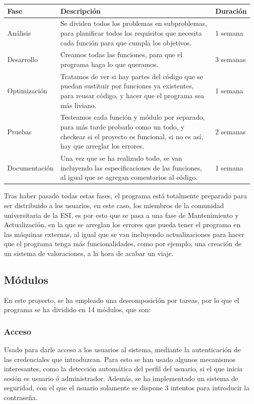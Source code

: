 \begin{tabular}{|p{2.5cm}|p{8cm}|p{2cm}|}
  \hline
  \textbf{Fase} & \textbf{Descripción} & \textbf{Duración} \\
  \hline
  Análisis & Se dividen todos los problemas en subproblemas, para planificar todos los requisitos que necesita cada función para que cumpla los objetivos. & 1 semana \\
  \hline
  Desarrollo & Creamos todas las funciones, para que el programa haga lo que queramos. & 3 semanas \\
  \hline
  Optimización & Tratamos de ver si hay partes del código que se puedan sustituir por funciones ya existentes, para reusar código, y hacer que el programa sea más liviano. & 1 semana \\
  \hline
  Pruebas & Testeamos cada función y módulo por separado, para más tarde probarlo como un todo, y checkear si el proyecto es funcional, si no es así, hay que arreglar los errores. & 2 semanas \\
  \hline
  Documentación & Una vez que se ha realizado todo, se van incluyendo las especificaciones de las funciones, al igual que se agregan comentarios al código. & 1 semana \\
  \hline
\end{tabular}

\bigskip

Tras haber pasado todas estas fases, el programa está totalmente preparado para ser distribuido a los usuarios, en este caso, los miembros de la comunidad universitaria de la ESI,
es por esto que se pasa a una fase de Mantenimiento y Actualización, en la que se arreglan los errores que pueda tener el programa en las máquinas externas,
al igual que se van incluyendo actualizaciones para hacer que el programa tenga más funcionalidades, como por ejemplo, una creación de un sistema de valoraciones, a la hora de acabar un viaje.

\subsection{Módulos}

En este proyecto, se ha empleado una descomposición por tareas, por lo que el programa se ha dividido en 14 módulos, que son:

\subsubsection{Acceso}

Usado para darle acceso a los usuarios al sistema, mediante la autenticación de las credenciales que introduzcan.
Para esto se han usado algunos mecanismos interesantes, como la detección automática del perfil del usuario, si el que inicia sesión es usuario ó administrador.
Además, se ha implementado un sistema de seguridad, con el que el usuario solamente se dispone 3 intentos para introducir la contraseña.\\

